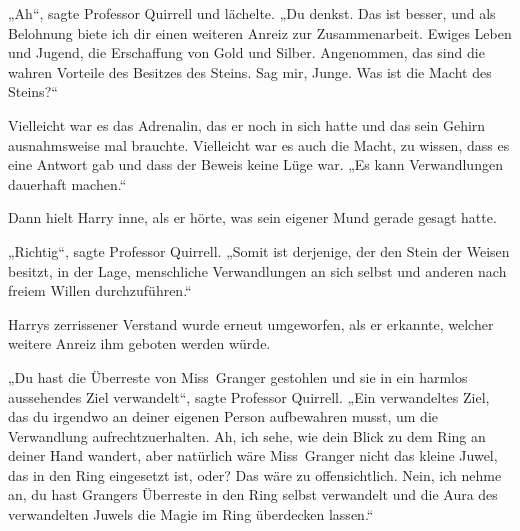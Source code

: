 „Ah“, sagte Professor Quirrell und lächelte. „Du denkst. Das ist besser, und als Belohnung biete ich dir einen weiteren Anreiz zur Zusammenarbeit. Ewiges Leben und Jugend, die Erschaffung von Gold und Silber. Angenommen, das sind die wahren Vorteile des Besitzes des Steins. Sag mir, Junge. Was ist die Macht des Steins?“

Vielleicht war es das Adrenalin, das er noch in sich hatte und das sein Gehirn ausnahmsweise mal brauchte. Vielleicht war es auch die Macht, zu wissen, dass es eine Antwort gab und dass der Beweis keine Lüge war.
„Es kann Verwandlungen dauerhaft machen.“

Dann hielt Harry inne, als er hörte, was sein eigener Mund gerade gesagt hatte.

„Richtig“, sagte Professor Quirrell. „Somit ist derjenige, der den Stein der Weisen besitzt, in der Lage, menschliche Verwandlungen an sich selbst und anderen nach freiem Willen durchzuführen.“

Harrys zerrissener Verstand wurde erneut umgeworfen, als er erkannte, welcher weitere Anreiz ihm geboten werden würde.

„Du hast die Überreste von Miss~Granger gestohlen und sie in ein harmlos aussehendes Ziel verwandelt“, sagte Professor Quirrell.
„Ein verwandeltes Ziel, das du irgendwo an deiner eigenen Person aufbewahren musst, um die Verwandlung aufrechtzuerhalten. Ah, ich sehe, wie dein Blick zu dem Ring an deiner Hand wandert, aber natürlich wäre Miss~Granger nicht das kleine Juwel, das in den Ring eingesetzt ist, oder? Das wäre zu offensichtlich. Nein, ich nehme an, du hast Grangers Überreste in den Ring selbst verwandelt und die Aura des verwandelten Juwels die Magie im Ring überdecken lassen.“

